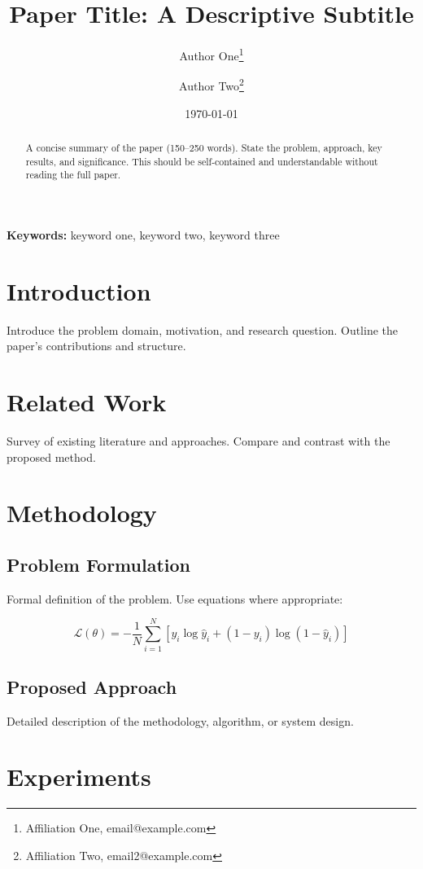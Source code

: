 \documentclass[12pt,a4paper]{article}
\title{Paper Title: A Descriptive Subtitle}
\author{
  Author One\thanks{Affiliation One, email@example.com} \and
  Author Two\thanks{Affiliation Two, email2@example.com}
}
\date{\today}
\begin{document}
\maketitle

\begin{abstract}
A concise summary of the paper (150--250 words). State the problem, approach, key results, and significance. This should be self-contained and understandable without reading the full paper.
\end{abstract}

\textbf{Keywords:} keyword one, keyword two, keyword three

\section{Introduction}

Introduce the problem domain, motivation, and research question. Outline the paper's contributions and structure.

\section{Related Work}

Survey of existing literature and approaches. Compare and contrast with the proposed method.

\section{Methodology}

\subsection{Problem Formulation}

Formal definition of the problem. Use equations where appropriate:

\begin{equation}
  \mathcal{L}(\theta) = -\frac{1}{N} \sum_{i=1}^{N} \left[ y_i \log \hat{y}_i + (1 - y_i) \log(1 - \hat{y}_i) \right]
\end{equation}

\subsection{Proposed Approach}

Detailed description of the methodology, algorithm, or system design.

\section{Experiments}
\end{document}
